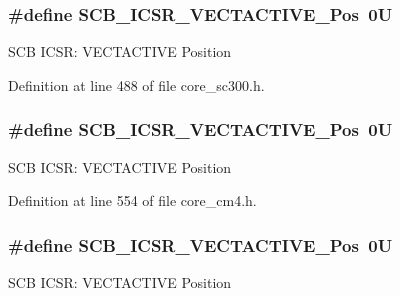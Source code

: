 \subsubsection[{\texorpdfstring{S\+C\+B\+\_\+\+I\+C\+S\+R\+\_\+\+V\+E\+C\+T\+A\+C\+T\+I\+V\+E\+\_\+\+Pos}{SCB_ICSR_VECTACTIVE_Pos}}]{\setlength{\rightskip}{0pt plus 5cm}\#define S\+C\+B\+\_\+\+I\+C\+S\+R\+\_\+\+V\+E\+C\+T\+A\+C\+T\+I\+V\+E\+\_\+\+Pos~0U}\hypertarget{group___c_m_s_i_s___s_c_b_gae4f602c7c5c895d5fb687b71b0979fc3}{}\label{group___c_m_s_i_s___s_c_b_gae4f602c7c5c895d5fb687b71b0979fc3}
S\+CB I\+C\+SR\+: V\+E\+C\+T\+A\+C\+T\+I\+VE Position 

Definition at line 488 of file core\+\_\+sc300.\+h.

\subsubsection[{\texorpdfstring{S\+C\+B\+\_\+\+I\+C\+S\+R\+\_\+\+V\+E\+C\+T\+A\+C\+T\+I\+V\+E\+\_\+\+Pos}{SCB_ICSR_VECTACTIVE_Pos}}]{\setlength{\rightskip}{0pt plus 5cm}\#define S\+C\+B\+\_\+\+I\+C\+S\+R\+\_\+\+V\+E\+C\+T\+A\+C\+T\+I\+V\+E\+\_\+\+Pos~0U}\hypertarget{group___c_m_s_i_s___s_c_b_gae4f602c7c5c895d5fb687b71b0979fc3}{}\label{group___c_m_s_i_s___s_c_b_gae4f602c7c5c895d5fb687b71b0979fc3}
S\+CB I\+C\+SR\+: V\+E\+C\+T\+A\+C\+T\+I\+VE Position 

Definition at line 554 of file core\+\_\+cm4.\+h.

\subsubsection[{\texorpdfstring{S\+C\+B\+\_\+\+I\+C\+S\+R\+\_\+\+V\+E\+C\+T\+A\+C\+T\+I\+V\+E\+\_\+\+Pos}{SCB_ICSR_VECTACTIVE_Pos}}]{\setlength{\rightskip}{0pt plus 5cm}\#define S\+C\+B\+\_\+\+I\+C\+S\+R\+\_\+\+V\+E\+C\+T\+A\+C\+T\+I\+V\+E\+\_\+\+Pos~0U}\hypertarget{group___c_m_s_i_s___s_c_b_gae4f602c7c5c895d5fb687b71b0979fc3}{}\label{group___c_m_s_i_s___s_c_b_gae4f602c7c5c895d5fb687b71b0979fc3}
S\+CB I\+C\+SR\+: V\+E\+C\+T\+A\+C\+T\+I\+VE Position 

